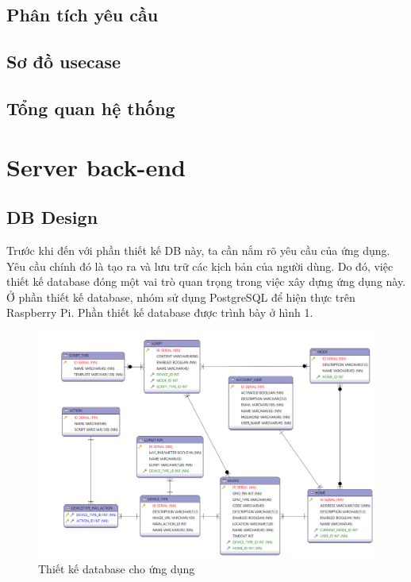 \documentclass[11pt,a4paper,oneside]{book}
\begin{document}
\section{Phân tích yêu cầu}
\newpage
\section{Sơ đồ usecase}
\newpage
\section{Tổng quan hệ thống}

\chapter{Server back-end}

\newpage
\section{DB Design}

Trước khi đến với phần thiết kế DB này, ta cần nắm rõ yêu cầu của ứng dụng. Yêu cầu chính đó là tạo ra và lưu trữ các kịch bản của người dùng. Do đó, việc thiết kế database đóng một vai trò quan trọng trong việc xây dựng ứng dụng này. Ở phần thiết kế database, nhóm sử dụng PostgreSQL để hiện thực trên Raspberry Pi. Phần thiết kế database được trình bày ở hình 1.

\begin{figure}[h]
  \centering
     \includegraphics[width=15cm]{3-smart-home-db}
  \caption{Thiết kế database cho ứng dụng}\label{fig:3-smart-home-db}
\end{figure}
\end{document}
